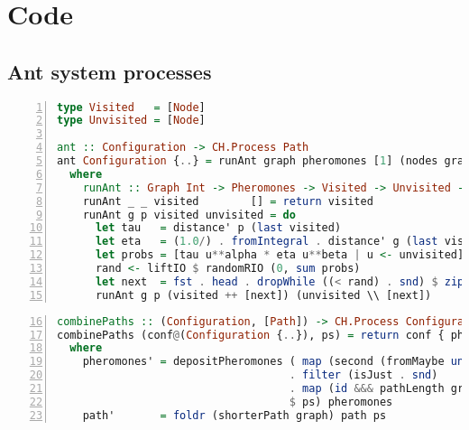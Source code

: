 \chapter{Code}

\begin{landscape}
\section{Ant system processes}
\label{app:ant_system_processes}

\begin{lstlisting}[language=Haskell,frame=tb,numbers=left,caption=Type aliases and the implementation of ants as a \textsf{Cloud Haskell} process that returns a path.]
type Visited   = [Node]
type Unvisited = [Node]

ant :: Configuration -> CH.Process Path
ant Configuration {..} = runAnt graph pheromones [1] (nodes graph \\ [1])
  where
    runAnt :: Graph Int -> Pheromones -> Visited -> Unvisited -> CH.Process Path
    runAnt _ _ visited        [] = return visited
    runAnt g p visited unvisited = do
      let tau   = distance' p (last visited)
      let eta   = (1.0/) . fromIntegral . distance' g (last visited)
      let probs = [tau u**alpha * eta u**beta | u <- unvisited]
      rand <- liftIO $ randomRIO (0, sum probs)
      let next  = fst . head . dropWhile ((< rand) . snd) $ zip unvisited (scanl1 (+) probs)
      runAnt g p (visited ++ [next]) (unvisited \\ [next])
\end{lstlisting}


\begin{lstlisting}[language=Haskell,frame=tb,numbers=left,caption=Implementation of a combinator process for paths as \textsf{Cloud Haskell} process.,firstnumber=16]
combinePaths :: (Configuration, [Path]) -> CH.Process Configuration
combinePaths (conf@(Configuration {..}), ps) = return conf { pheromones = pheromones', path = path' }
  where
    pheromones' = depositPheromones ( map (second (fromMaybe undefined))
                                    . filter (isJust . snd)
                                    . map (id &&& pathLength graph)
                                    $ ps) pheromones
    path'       = foldr (shorterPath graph) path ps
\end{lstlisting}

\end{landscape}